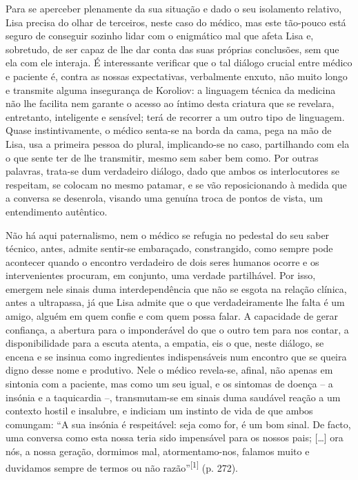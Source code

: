 \documentclass{article}
\begin{document}
Para se aperceber plenamente da sua situação e dado o seu isolamento relativo,
Lisa precisa do olhar de terceiros, neste caso do médico, mas este tão-pouco
está seguro de conseguir sozinho lidar com o enigmático mal que afeta Lisa e,
sobretudo, de ser capaz de lhe dar conta das suas próprias conclusões, sem que
ela com ele interaja. É interessante verificar que o tal diálogo crucial entre
médico e paciente é, contra as nossas expectativas, verbalmente enxuto, não
muito longo e transmite alguma insegurança de Koroliov: a linguagem técnica da
medicina não lhe facilita nem garante o acesso ao íntimo desta criatura que se
revelara, entretanto, inteligente e sensível; terá de recorrer a um outro tipo
de linguagem. Quase instintivamente, o médico senta-se na borda da cama, pega na
mão de Lisa, usa a primeira pessoa do plural, implicando-se no caso, partilhando
com ela o que sente ter de lhe transmitir, mesmo sem saber bem como. Por outras
palavras, trata-se dum verdadeiro diálogo, dado que ambos os interlocutores se
respeitam, se colocam no mesmo patamar, e se vão reposicionando à medida que a
conversa se desenrola, visando uma genuína troca de pontos de vista, um
entendimento autêntico.

Não há aqui paternalismo, nem o médico se refugia no pedestal do seu saber
técnico, antes, admite sentir-se embaraçado, constrangido, como sempre pode
acontecer quando o encontro verdadeiro de dois seres humanos ocorre e os
intervenientes procuram, em conjunto, uma verdade partilhável. Por isso, emergem
nele sinais duma interdependência que não se esgota na relação clínica, antes a
ultrapassa, já que Lisa admite que o que verdadeiramente lhe falta é um amigo,
alguém em quem confie e com quem possa falar. A capacidade de gerar confiança, a
abertura para o imponderável do que o outro tem para nos contar, a
disponibilidade para a escuta atenta, a empatia, eis o que, neste diálogo, se
encena e se insinua como ingredientes indispensáveis num encontro que se queira
digno desse nome e produtivo. Nele o médico revela-se, afinal, não apenas em
sintonia com a paciente, mas como um seu igual, e os sintomas de doença – a
insónia e a taquicardia –, transmutam-se em sinais duma saudável reação a um
contexto hostil e insalubre, e indiciam um instinto de vida de que ambos
comungam: “A sua insónia é respeitável: seja como for, é um bom sinal. De facto,
uma conversa como esta nossa teria sido impensável para os nossos pais; […] ora
nós, a nossa geração, dormimos mal, atormentamo-nos, falamos muito e duvidamos
sempre de termos ou não razão”\textsuperscript{[}\textsuperscript{1}\textsuperscript{]}
(p. 272).
\end{document}
